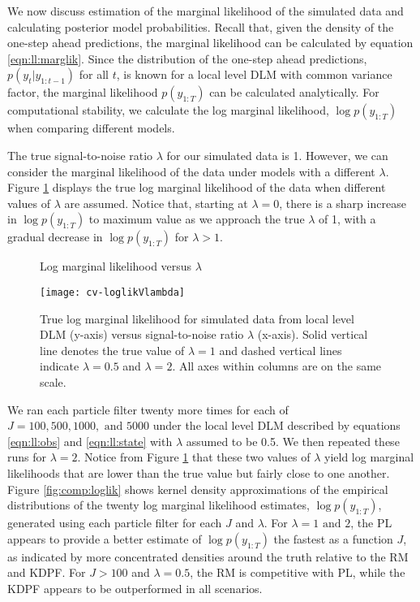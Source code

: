 We now discuss estimation of the marginal likelihood of the simulated data and calculating posterior model probabilities. Recall that, given the density of the one-step ahead predictions, the marginal likelihood can be calculated by equation \eqref{eqn:ll:marglik}. Since the distribution of the one-step ahead predictions, $p(y_t|y_{1:t-1})$ for all $t$, is known for a local level DLM with common variance factor, the marginal likelihood $p(y_{1:T})$ can be calculated analytically. For computational stability, we calculate the log marginal likelihood, $\log p(y_{1:T})$ when comparing different models.

The true signal-to-noise ratio $\lambda$ for our simulated data is 1. However, we can consider the marginal likelihood of the data under models with a different $\lambda$. Figure \ref{fig:comp:lambda} displays the true log marginal likelihood of the data when different values of $\lambda$ are assumed. Notice that, starting at $\lambda = 0$, there is a sharp increase in $\log p(y_{1:T})$ to maximum value as we approach the true $\lambda$ of 1, with a gradual decrease in $\log p(y_{1:T})$ for $\lambda > 1$.

\begin{figure}[ht]
\ssp
\centering
\caption{Log marginal likelihood versus $\lambda$} \label{fig:comp:lambda}
\texttt{[image: cv-loglikVlambda]}
\caption*{True log marginal likelihood for simulated data from local level DLM (y-axis) versus signal-to-noise ratio $\lambda$ (x-axis). Solid vertical line denotes the true value of $\lambda = 1$ and dashed vertical lines indicate $\lambda = 0.5$ and $\lambda = 2$. All axes within columns are on the same scale.}
\end{figure}

We ran each particle filter twenty more times for each of $J = 100, 500, 1000, \mbox{ and } 5000$ under the local level DLM described by equations \eqref{eqn:ll:obs} and \eqref{eqn:ll:state} with $\lambda$ assumed to be 0.5. We then repeated these runs for $\lambda = 2$. Notice from Figure \ref{fig:comp:lambda} that these two values of $\lambda$ yield log marginal likelihoods that are lower than the true value but fairly close to one another. Figure \ref{fig:comp:loglik} shows kernel density approximations of the empirical distributions of the twenty log marginal likelihood estimates, $\log p(y_{1:T})$, generated using each particle filter for each $J$ and $\lambda$. For $\lambda = 1 \mbox{ and } 2$, the PL appears to provide a better estimate of $\log p(y_{1:T})$ the fastest as a function $J$, as indicated by more concentrated densities around the truth relative to the RM and KDPF. For $J > 100$ and $\lambda = 0.5$, the RM is competitive with PL, while the KDPF appears to be outperformed in all scenarios.


